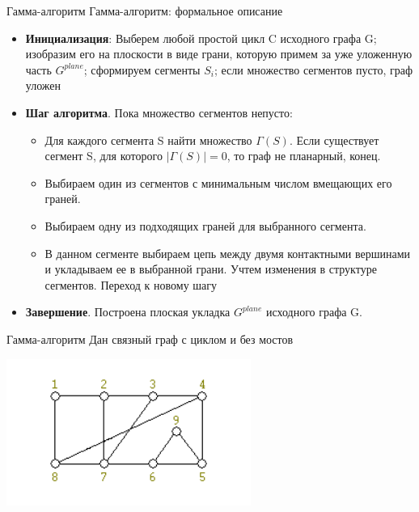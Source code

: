 \documentclass[10pt]{beamer}
\begin{document}
\begin{frame}[fragile]{Гамма-алгоритм}
Гамма-алгоритм: формальное описание
    \begin{itemize}
        \item \textbf{Инициализация}: Выберем любой простой цикл C исходного графа G; изобразим его на плоскости в виде грани, которую примем за уже уложенную часть $G^{plane}$; сформируем сегменты $S_i$; если множество сегментов пусто, граф уложен
        \item \textbf{Шаг алгоритма}. Пока множество сегментов непусто:
        
            \begin{itemize}
                \item Для каждого сегмента S найти множество $\Gamma(S)$. Если существует сегмент S, для которого $|\Gamma(S)| = 0$, то граф не планарный, конец.
                \item Выбираем один из сегментов с минимальным числом вмещающих его граней.
                \item Выбираем одну из подходящих граней для выбранного сегмента. 
                \item В данном сегменте выбираем цепь между двумя контактными вершинами и укладываем ее в выбранной грани. Учтем изменения в структуре сегментов. Переход к новому шагу
            \end{itemize}
        \item \textbf{Завершение}. Построена плоская укладка $G^{plane}$ исходного графа G.
        
    \end{itemize}
    
\end{frame}

\begin{frame}[fragile]{Гамма-алгоритм}
Дан связный граф с циклом и без мостов
\begin{center}
    \includegraphics[width=8cm]{Term_2/Source/images/5_gamma_1.png}
\end{center}
\end{frame}
\end{document}
